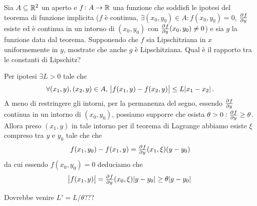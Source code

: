 \begin{es}
  Sia $ A \subseteq \mathbb{R}^2 $ un aperto e $ f \colon A \to \mathbb{R} $ una funzione che soddisfi le ipotesi del teorema di funzione implicita ($ f $ è continua, $ \exists (x_0, y_0) \in A : f(x_0, y_0) = 0 $, $ \pd{f}{y} $ esiste ed è continua in un intorno di $ (x_0, y_0) $ con $ \pd{f}{y}(x_0, y_0) \neq 0 $) e sia $ g $ la funzione data dal teorema. Supponendo che $ f $ sia Lipschitziana in $ x $ uniformemente in $ y $, mostrate che anche $ g $ è Lipschitziana. Qual è il rapporto tra le constanti di Lipschitz?
\end{es}
%
Per ipotesi $ \exists L > 0 $ tale che \[\forall (x_1, y), (x_2, y) \in A, \ \abs{f(x_1, y) - f(x_2, y)} \leq L \abs{x_1 - x_2}.\] A meno di restringere gli intorni, per la permanenza del segno, essendo $ \pd{f}{y} $ continua in un intorno di $ (x_0, y_0) $, possiamo supporre che esista $ \theta > 0 : \pd{f}{y} \geq \theta $. Allora preso $ (x_1, y) $ in tale intorno per il teorema di Lagrange abbiamo esiste $ \xi $ compreso tra $ y $ e $ y_0 $ tale che che \[f(x_1, y_0) - f(x_1, y) = \pd{f}{y}(x_1, \xi)(y - y_0)\] da cui essendo $ f(x_0, y_0) = 0 $ deduciamo che
\begin{equation*}
  \abs{f(x_1, y)} = \pd{f}{y}(x_0, \xi) \abs{y - y_0} \geq \theta \abs{y - y_0}
\end{equation*}

Dovrebbe venire $ L' = L/\theta $???


